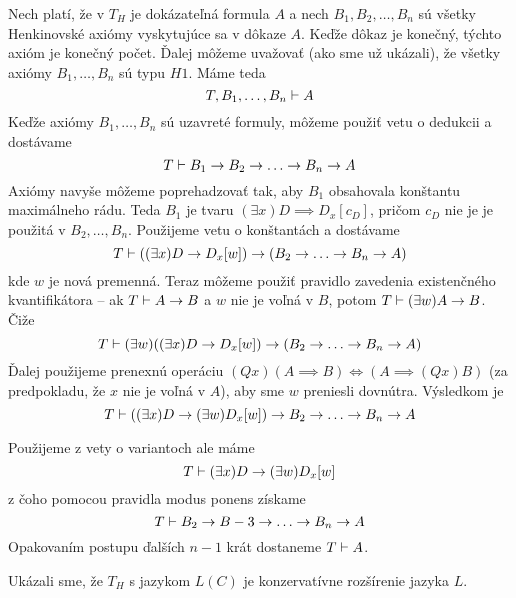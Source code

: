 \begin{dokaz}
    Nech platí, že v $T_H$ je dokázateľná formula $A$
    a nech $B_1, B_2, \ldots ,B_n$ sú všetky Henkinovské
    axiómy vyskytujúce sa v dôkaze $A$. Keďže dôkaz je konečný, týchto
    axióm je konečný počet. Ďalej môžeme uvažovať (ako sme už ukázali),
    že všetky axiómy $B_1, \ldots, B_n$ sú typu $H1$.
    Máme teda
    \begin{equation*}
        T, B_1, \dots ,B_n \vdash A
    \end{equation*}
    Keďže axiómy $B_1,\ldots,B_n$ sú uzavreté formuly, môžeme použiť vetu o dedukcii
    a dostávame
    \begin{equation*}
        T \vdash B_1 \rightarrow B_2 \rightarrow \ldots \rightarrow B_n \rightarrow A
    \end{equation*}
    Axiómy navyše môžeme poprehadzovať tak, aby $B_1$ obsahovala konštantu maximálneho rádu.
    Teda $B_1$ je tvaru $(\exists x) D \implies D_x[c_D]$, pričom $c_D$ nie je je použitá
    v $B_2, \ldots, B_n$. Použijeme vetu o konštantách a dostávame
    \begin{equation*}
        T \vdash ((\exists x) D \rightarrow D_x[w] ) \rightarrow (B_2 \rightarrow \ldots \rightarrow B_n \rightarrow A)
    \end{equation*}
    kde $w$ je nová premenná.
    Teraz môžeme použiť pravidlo zavedenia existenčného kvantifikátora --
    ak $T \vdash A \rightarrow B$ a $w$ nie je voľná v $B$, potom $T\vdash (\exists w) A \rightarrow B$.
    Čiže
    \begin{equation*}
        T \vdash (\exists w) ((\exists x)D \rightarrow D_x[w]) \rightarrow (B_2 \rightarrow
            \ldots \rightarrow B_n \rightarrow A)
    \end{equation*}
    Ďalej použijeme prenexnú operáciu $(Qx) (A\implies B) \iff (A\implies
    (Qx)B)$ (za predpokladu, že $x$ nie je voľná v $A$), aby sme $w$
    preniesli dovnútra. Výsledkom je
    \begin{equation*}
        T \vdash ((\exists x) D \rightarrow (\exists w)D_x[w]) \rightarrow B_2 \rightarrow \ldots \rightarrow B_n \rightarrow A
    \end{equation*}

    Použijeme z vety o variantoch ale máme
    \begin{equation*}
        T \vdash ( \exists x ) D \rightarrow (\exists w) D_x[w] \\
    \end{equation*}
    z čoho pomocou pravidla modus ponens získame
    \begin{equation*}
        T \vdash B_2 \rightarrow B-3 \rightarrow \ldots \rightarrow B_n \rightarrow A
    \end{equation*}
    Opakovaním postupu ďalších $n-1$ krát dostaneme $T \vdash A$.

    Ukázali sme, že $T_H$ s jazykom $L(C)$ je konzervatívne rozšírenie jazyka $L$.
\end{dokaz}

